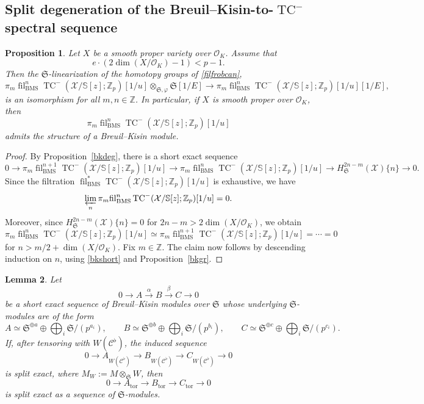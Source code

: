 \documentclass[11pt]{amsart}
\newtheorem{lemma}{Lemma}[section]
\newtheorem{prop}[lemma]{Proposition}
\numberwithin{equation}{section}
\newcommand{\Z}{\mathbb{Z}}
\newcommand{\sC}{\mathcal{C}}
\newcommand{\sO}{\mathcal{O}}
\newcommand{\tors}{\operatorname{tor}}
\newcommand{\sX}{\mathcal{X}}
\newcommand{\mf}{\mathfrak}
\newcommand{\fil}{{\operatorname{fil}}}
\newcommand{\BMS}{\mathrm{BMS}}
\newcommand{\mS}{\mf{S}}
\numberwithin{equation}{section}
\renewcommand{\lim}{\operatornamewithlimits{\varprojlim}}
\newcommand{\TCn}{\operatorname{TC}^{-}}
\newcommand{\bS}{\mathbb{S}}
\begin{document}
\subsection{\texorpdfstring{Split degeneration of the Breuil--Kisin-to-$\TCn$ spectral sequence}{Split degeneration of the Breuil--Kisin-to-TC spectral sequence}}

\begin{prop}
Let $X$ be a smooth proper variety over $\sO_K$. Assume that
\[
  e\cdot (2\dim(X/\sO_K)-1)< p-1.
\]
Then the $\mS$-linearization of the homotopy groups of \eqref{filfrobcan},
\begin{equation}\label{bkfilmor}
  \pi_m \fil_{\BMS}^n\TCn(\sX/\bS[z];\Z_p)[1/u]
  \otimes_{\mS,\varphi}\mS[1/E]
  \longrightarrow
  \pi_m \fil_{\BMS}^n\TCn(\sX/\bS[z];\Z_p)[1/u][1/E],
\end{equation}
is an isomorphism for all $m,n\in\Z$. In particular, if $X$ is smooth proper over $\sO_K$, then
\[
  \pi_m \fil_{\BMS}^n\TCn(\sX/\bS[z];\Z_p)[1/u]
\]
admits the structure of a Breuil--Kisin module.
\end{prop}

\begin{proof}
By Proposition~\ref{bkdeg}, there is a short exact sequence
\begin{equation}\label{bkshort}
  0 \to \pi_m \fil_{\BMS}^{n+1}\TCn(\sX/\bS[z];\Z_p)[1/u]
  \to \pi_m \fil_{\BMS}^{n}\TCn(\sX/\bS[z];\Z_p)[1/u]
  \to H_{\mS}^{2n-m}(\sX)\{n\}
  \to 0.
\end{equation}
Since the filtration $\fil_{\BMS}^*\TCn(\sX/\bS[z];\Z_p)[1/u]$ is exhaustive, we have
\[
  \lim_n \pi_m \fil_{\BMS}^{n}\TCn(\sX/\bS[z];\Z_p)[1/u]=0.
\]
Moreover, since $H_{\mS}^{2n-m}(\sX)\{n\}=0$ for $2n-m>2\dim(X/\sO_K)$, we obtain
\[
  \pi_m \fil_{\BMS}^{n}\TCn(\sX/\bS[z];\Z_p)[1/u]
  \simeq
  \pi_m \fil_{\BMS}^{n+1}\TCn(\sX/\bS[z];\Z_p)[1/u]
  = \cdots =0
\]
for $n>m/2+\dim(X/\sO_K)$. Fix $m\in\Z$. The claim now follows by descending induction on $n$, using \eqref{bkshort} and Proposition~\ref{bkgr}.
\end{proof}%
\begin{lemma}\label{torssplit}
 Let
\[
  0\to A \xrightarrow{\alpha} B \xrightarrow{\beta} C\to 0
\]
be a short exact sequence of Breuil--Kisin modules over $\mS$ whose underlying $\mS$-modules are of the form
\[
  A\simeq \mS^{\oplus a}\oplus  \bigoplus_i \mS/(p^{a_i}),\qquad
  B\simeq \mS^{\oplus b}\oplus \bigoplus_i \mS/(p^{b_i}),\qquad
  C\simeq \mS^{\oplus c}\oplus \bigoplus_i \mS/(p^{c_i}).
\]
If, after tensoring with $W(\sC^\flat)$, the
induced sequence
\[
  0\to A_{W(\sC^\flat)}\to B_{W(\sC^\flat)}\to C_{W(\sC^\flat)}\to 0
\]
is split exact, where $M_W:=M\otimes_{\mS}W$, then
\[
  0\to A_{\tors}\to B_{\tors}\to C_{\tors}\to 0
\]
is split exact as a sequence of $\mS$-modules.
\end{lemma}
\end{document}
